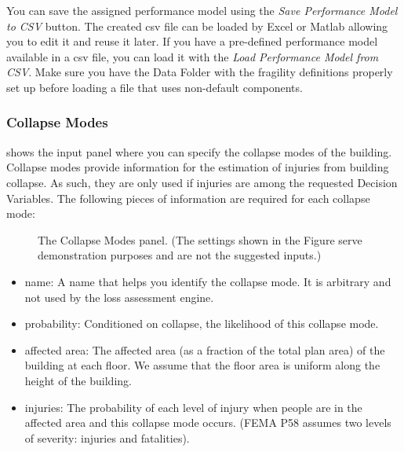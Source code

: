 You can save the assigned performance model using the \emph{Save Performance Model to CSV} button. The created csv file can be loaded by Excel or Matlab allowing you to edit it and reuse it later. If you have a pre-defined performance model available in a csv file, you can load it with the \emph{Load Performance Model from CSV}. Make sure you have the Data Folder with the fragility definitions properly set up before loading a file that uses non-default components.

\subsubsection{Collapse Modes}

 shows the input panel where you can specify the collapse modes of the building. Collapse modes provide information for the estimation of injuries from building collapse. As such, they are only used if injuries are among the requested Decision Variables. The following pieces of information are required for each collapse mode:

\begin{figure}[!htbp]
  \caption{The Collapse Modes panel. (The settings shown in the Figure serve demonstration purposes and are not the suggested inputs.)}
  \label{fig:dl_p58_collmod}
\end{figure}

\begin{itemize}
    \item name: A name that helps you identify the collapse mode. It is arbitrary and not used by the loss assessment engine.
    \item probability: Conditioned on collapse, the likelihood of this collapse mode.
    \item affected area: The affected area (as a fraction of the total plan area) of the building at each floor. We assume that the floor area is uniform along the height of the building.
    \item injuries: The probability of each level of injury when people are in the affected area and this collapse mode occurs. (FEMA P58 assumes two levels of severity: injuries and fatalities).
\end{itemize}

